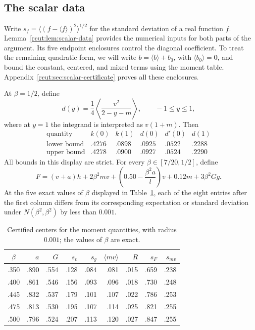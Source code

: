 \subsection{The scalar data}
\label{rcut:sec:scalar-data}

Write \(s_f=\langle(f-\langle f\rangle)^2\rangle^{1/2}\) for the
standard deviation of a real function \(f\).
Lemma~\ref{rcut:lem:scalar-data} provides the numerical inputs for both
parts of the argument. Its five endpoint enclosures control the diagonal
coefficient. To treat the remaining quadratic form, we will write
\(b=\langle b\rangle+b_0\), with \(\langle b_0\rangle=0\), and
bound the constant, centered, and mixed terms using the moment table.
Appendix~\ref{rcut:sec:scalar-certificate} proves all these enclosures.

\begin{lemma}
\label{rcut:lem:scalar-data}
At \(\beta=1/2\), define
\[
 d(y)=\frac14\left\langle\frac{v^2}{2-y-m}\right\rangle,
 \qquad -1\leq y\leq1,
\]
where at \(y=1\) the integrand is interpreted as \(v(1+m)\).
Then
\begin{equation}
 \begin{array}{c|ccccc}
 \text{quantity}& k(0)&k(1)&d(0)&d'(0)&d(1)\\ \hline
 \text{lower bound}&.4276&.0898&.0925&.0522&.2288\\
 \text{upper bound}&.4278&.0900&.0927&.0524&.2290
 \end{array}
 \label{rcut:eq:scalar-five-enclosures}
\end{equation}
All bounds in this display are strict.
For every \(\beta\in[7/20,1/2]\), define
\begin{equation}
 F=(v+a)h+2\beta^2mv+
       \left(0.50-\frac{\beta^2a}{l}\right)v
       +0.12m+3\beta^2Gg.
 \label{rcut:eq:scalar-F}
\end{equation}
At the five exact values of \(\beta\) displayed in
Table~\ref{rcut:tab:scalar-moments}, each of the eight entries after the first
column differs from its corresponding expectation or standard deviation
under \(N(\beta^2,\beta^2)\) by less than \(0.001\).
\begin{table}[htbp]
 \centering
 \caption{Certified centers for the moment quantities, with radius
 \(0.001\); the values of \(\beta\) are exact.}
 \label{rcut:tab:scalar-moments}
 \begin{tabular}{c@{\quad}rrrrrrrr}
 \toprule
 \(\beta\)&\(a\)&\(G\)&\(s_v\)&\(s_g\)&
 \(\langle mv\rangle\)&\(R\)&\(s_F\)&\(s_{mv}\)\\
 \midrule
 .350&.890&.554&.128&.084&.081&.015&.659&.238\\
 .400&.861&.546&.156&.093&.096&.018&.730&.248\\
 .445&.832&.537&.179&.101&.107&.022&.786&.253\\
 .475&.813&.530&.195&.107&.114&.025&.821&.255\\
 .500&.796&.524&.207&.113&.120&.027&.847&.255\\
 \bottomrule
 \end{tabular}
\end{table}
\end{lemma}

